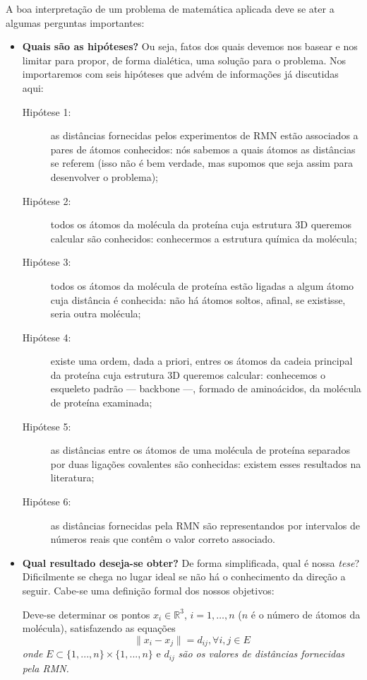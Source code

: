 \documentclass[a4paper,12pt]{article}
\begin{document}
	A boa interpretação de um problema de matemática aplicada deve se ater a algumas perguntas importantes:
	\begin{itemize}
		\item \textbf{Quais são as hipóteses?} Ou seja, fatos dos quais devemos nos basear e nos limitar para propor, de forma dialética, uma solução para o problema. Nos importaremos com seis hipóteses que advém de informações já discutidas aqui:
		\begin{description}
			\item[Hipótese 1:]as distâncias fornecidas pelos experimentos de RMN estão associados a pares de átomos conhecidos: nós sabemos a quais átomos as distâncias se referem (isso não é bem verdade, mas supomos que seja assim para desenvolver o problema);
			\item[Hipótese 2:]todos os átomos da molécula da proteína cuja estrutura 3D queremos calcular são conhecidos: conhecermos a estrutura química da molécula;
			\item[Hipótese 3:]todos os átomos da molécula de proteína estão ligadas a algum átomo cuja distância é conhecida: não há átomos soltos, afinal, se existisse, seria outra molécula;
			\item[Hipótese 4:]existe uma ordem, dada a priori, entres os átomos da cadeia principal da proteína cuja estrutura 3D queremos calcular: conhecemos o esqueleto padrão --- backbone ---, formado de aminoácidos, da molécula de proteína examinada;
			\item[Hipótese 5:]as distâncias entre os átomos de uma molécula de proteína separados por duas ligações covalentes são conhecidas: existem esses resultados na literatura;
			\item[Hipótese 6:]as distâncias fornecidas pela RMN são representandos por intervalos de números reais que contêm o valor correto associado.
		\end{description}
		
		\item \textbf{Qual resultado deseja-se obter?} De forma simplificada, qual é nossa \textit{tese}? Dificilmente se chega no lugar ideal se não há o conhecimento da direção a seguir. Cabe-se uma definição formal dos nossos objetivos:
		\begin{center}
			\begin{minipage}{0.9 \linewidth}
				Deve-se determinar os pontos $x_{i}\in\mathbb{R}^3$, $i = 1, \dots, n$ ($n$ é o número de átomos da molécula), satisfazendo as equações
				$$\|x_i -x_j\|=d_{ij} , \forall {i,j} \in E
				$$
				\textit{onde} $E \subset \{1, ...,n\} \times \{1, ...,n\}$ e $d_{ij}$ \textit{são os valores de distâncias fornecidas pela RMN.}
			\end{minipage}
		\end{center}
		

\end{itemize}
\end{document}
